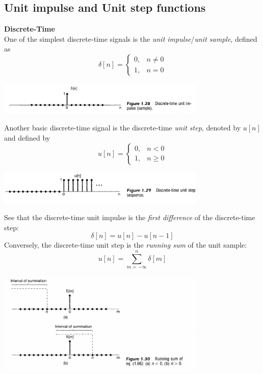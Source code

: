 \documentclass{report}
\begin{document}
\subsection{Unit impulse and Unit step functions}
\textbf{Discrete-Time}\\
One of the simplest discrete-time signals is the \textit{unit impulse}/\textit{unit sample}, defined as
\begin{equation*}
\delta[n]=\begin{cases}0,&n\neq0\\
1,&n=0\end{cases}
\end{equation*}
\begin{center}
\includegraphics[width=10cm]{a6}
\end{center}
Another basic discrete-time signal is the discrete-time \textit{unit step}, denoted by $u[n]$ and defined by
\begin{equation*}
u[n]=\begin{cases}
0,&n<0\\
1,&n\geq0\end{cases}
\end{equation*}
\begin{center}
\includegraphics[width=10cm]{a7}
\end{center}
See that the discrete-time unit impulse is the \textit{first difference} of the discrete-time step:
\begin{equation*}
\delta[n]=u[n]-u[n-1]
\end{equation*}
Conversely, the discrete-time unit step is the \textit{running sum} of the unit sample:
\begin{equation*}
u[n]=\sum^n_{m=-\infty}\delta[m]
\end{equation*}
\begin{center}
\includegraphics[width=10cm]{a8}
\end{center}
\end{document}
